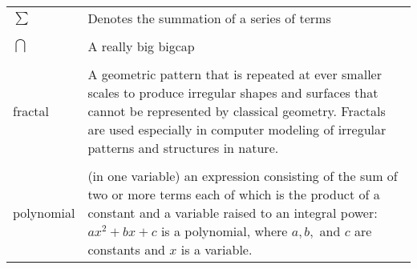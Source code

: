 \singlespacing
\begin{tabular}{l p{5in}} 
$\sum$ & Denotes the summation of a series of terms\\
\\%
$\bigcap$ & A really big bigcap\\
\\
fractal & A geometric pattern that is repeated at ever smaller
scales to produce irregular shapes and surfaces that cannot be represented by classical
geometry. Fractals are used especially in computer modeling of irregular patterns and structures in nature.\\
\\
polynomial & (in one variable) an expression consisting of the sum of two
or more terms each of which is the product of a constant and a
variable raised to an integral power: $ax^2 + bx + c$ is a
polynomial, where $a, b,$ and $c$ are constants and $x$ is a
variable.\\

\end{tabular}

\doublespacing
